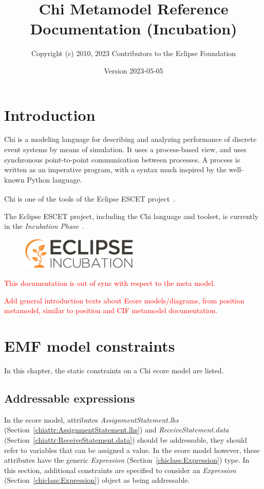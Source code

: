 \documentclass{report}
\title{Chi Metamodel Reference Documentation (Incubation)}
\author{Copyright (c) 2010, 2023 Contributors to the Eclipse Foundation}
\date{Version 2023-05-05}
\newcommand{\chiclass}[1]{\textit{#1} (Section~\ref{chiclass:#1})}
\newcommand{\chiattr}[1]{\textit{#1} (Section~\ref{chiattr:#1})}
\newcommand{\todo}[1]{\textcolor{red}{#1}}
\begin{document}
\maketitle
\tableofcontents

\chapter{Introduction}

Chi is a modeling language for describing and analyzing performance of
discrete event systems by means of simulation.
It uses a process-based view, and uses synchronous point-to-point
communication between processes. A process is written as an imperative
program, with a syntax much inspired by the well-known Python language.

Chi is one of the tools of the Eclipse ESCET\textsuperscript{\texttrademark{}}
project~\cite{Eclipse:ESCET}.

The Eclipse ESCET project, including the Chi language and toolset, is
currently in the \emph{Incubation Phase}~\cite{Eclipse:Incubation}.
\begin{figure}[H]
  \centering
  \includegraphics[width=0.5\textwidth]{figures/eclipse-incubation.png}
\end{figure}

\todo{This documentation is out of sync with respect to the meta model.}

\todo{Add general introduction texts about Ecore models/diagrams, from
position metamodel, similar to position and CIF metamodel documentation.}


\chapter{EMF model constraints}
In this chapter, the static constraints on a Chi ecore model are listed.

\section{Addressable expressions}\label{sect:addressable-expressions}
In the ecore model, attributes \chiattr{AssignmentStatement.lhs} and
\chiattr{ReceiveStatement.data} should be addressable, they should refer to
variables that can be assigned a value.
In the ecore model however, these attributes have the generic
\chiclass{Expression} type. In this section, additional constraints are
specified to consider an \chiclass{Expression} object as being addressable.
\end{document}
